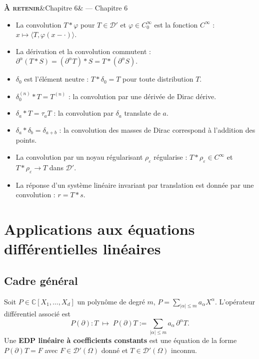 \documentclass[12pt,a4paper,openany]{book}
\theoremstyle{definition}
\theoremstyle{plain}
\theoremstyle{remark}
\newenvironment{retenir}[1]{%
	\begin{mdframed}[linewidth=3pt, linecolor=black!70,
		topline=false, rightline=false, bottomline=false,
		backgroundcolor=shaderet,
		skipabove=14pt, skipbelow=14pt,
		innerleftmargin=14pt, innerrightmargin=8pt,
		innertopmargin=8pt, innerbottommargin=8pt]%
		\noindent\textbf{\scshape À retenir}\ifx&#1&\else{} — #1\fi\par\smallskip%
	}{%
	\end{mdframed}%
}
\begin{document}
	\begin{retenir}{Chapitre 6}
		\begin{itemize}
			\item La convolution $T * \varphi$ pour $T \in \mathcal{D}'$ et $\varphi \in C_0^\infty$ est la fonction $C^\infty$ : $x \mapsto \langle T, \varphi(x-\cdot) \rangle$.
			\item La dérivation et la convolution commutent : $\partial^\alpha(T*S) = (\partial^\alpha T)*S = T*(\partial^\alpha S)$.
			\item $\delta_0$ est l'élément neutre : $T * \delta_0 = T$ pour toute distribution $T$.
			\item $\delta_0^{(n)} * T = T^{(n)}$ : la convolution par une dérivée de Dirac dérive.
			\item $\delta_a * T = \tau_a T$ : la convolution par $\delta_a$ translate de $a$.
			\item $\delta_a * \delta_b = \delta_{a+b}$ : la convolution des masses de Dirac correspond à l'addition des points.
			\item La convolution par un noyau régularisant $\rho_\varepsilon$ régularise : $T * \rho_\varepsilon \in C^\infty$ et $T * \rho_\varepsilon \to T$ dans $\mathcal{D}'$.
			\item La réponse d'un système linéaire invariant par translation est donnée par une convolution : $r = T * s$.
		\end{itemize}
	\end{retenir}
	
	\chapter{Applications aux équations différentielles linéaires}
	
	\section{Cadre général}
	
	\begin{definition}
		Soit $P \in \mathbb{C}[X_1,\ldots,X_d]$ un polynôme de degré $m$,
		$P = \sum_{|\alpha|\leq m} a_\alpha X^\alpha$.
		L'opérateur différentiel associé est
		\[
		P(\partial) : T \;\longmapsto\; P(\partial)T
		:= \sum_{|\alpha|\leq m} a_\alpha\,\partial^\alpha T.
		\]
		Une \textbf{EDP linéaire à coefficients constants} est une équation de la forme
		$P(\partial)T = F$ avec $F \in \mathcal{D}'(\Omega)$ donné et
		$T \in \mathcal{D}'(\Omega)$ inconnu.
	\end{definition}
	
\end{document}
